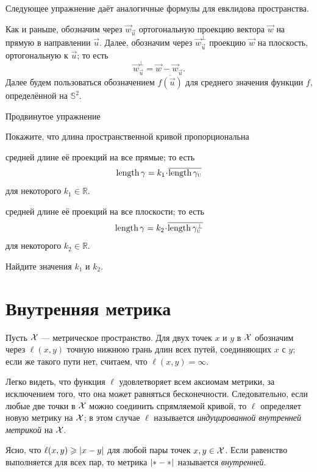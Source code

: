 Следующее упражнение даёт аналогичные формулы для евклидова пространства.

Как и раньше, обозначим через $\vec w_{\vec u}$ ортогональную проекцию вектора $\vec w$ на прямую в направлении $\vec u$.
Далее, обозначим через $\vec w_{\vec u}^\bot$ проекцию $\vec w$ на плоскость, ортогональную к $\vec u$;
то есть
\[\vec w_\vec u^\bot=\vec w - \vec w_{\vec u}.\]
Далее будем пользоваться обозначением 
$\overline{f(\vec u)}$ для среднего значения
функции $f$, определённой на $\mathbb{S}^2$.

\begin{thm}{Продвинутое упражнение}\label{adex:more-croftons}
{\sloppy
Покажите, что длина пространственной кривой пропорциональна 

}
\begin{subthm}{}
средней длине её проекций на все прямые; то есть
\[\length\gamma=k_1\cdot\overline{\length\gamma_{\vec u}}\]
для некоторого $k_1 \in \mathbb{R}$.
\end{subthm}
\begin{subthm}{}средней длине её проекций на все плоскости; то есть
\[\length\gamma=k_2\cdot\overline{\length\gamma_{\vec u}^\bot}\]
для некоторого $k_2 \in \mathbb{R}$.
\end{subthm}
Найдите значения $k_1$ и $k_2$.
\end{thm}



\section{Внутренняя метрика}\label{sec:Length metric}

Пусть $\mathcal{X}$ --- метрическое пространство.
Для двух точек $x$ и $y$ в $\mathcal{X}$ обозначим через $\ell(x,y)$ точную нижнюю грань длин всех путей, соединяющих $x$ с $y$;
если же такого пути нет, считаем, что $\ell(x,y)=\infty$.

Легко видеть, что функция $\ell$ удовлетворяет всем аксиомам метрики, за исключением того, что она может равняться бесконечности.
Следовательно, если любые две точки в $\mathcal{X}$ можно соединить спрямляемой кривой, то $\ell$ определяет новую метрику на $\mathcal{X}$;
в этом случае $\ell$ называется \emph{индуцированной внутренней метрикой} на $\mathcal{X}$.

Ясно, что $\ell(x,y)\ge \dist{x}{y}{}$ для любой пары точек $x,y\in \mathcal{X}$.
Если равенство выполняется для всех пар, то метрика $\dist{{*}}{{*}}{}$ называется \emph{внутренней}.

